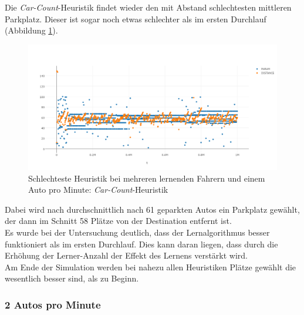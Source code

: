 Die \emph{Car-Count}-Heuristik findet wieder den mit Abstand schlechtesten mittleren Parkplatz. Dieser ist sogar noch etwas schlechter als im ersten Durchlauf (Abbildung \ref{fig:res_pm_1pm_worst}).\\
\begin{figure}
	\includegraphics[width=\textwidth]{analyse/SomeMutants/1pm/car1some.png}
	\caption{Schlechteste Heuristik bei mehreren lernenden Fahrern und einem Auto pro Minute: \emph{Car-Count}-Heuristik}\label{fig:res_pm_1pm_worst}
\end{figure}
Dabei wird nach durchschnittlich nach 61 geparkten Autos ein Parkplatz gewählt, der dann im Schnitt 58 Plätze von der Destination entfernt ist.\\

Es wurde bei der Untersuchung deutlich, dass der Lernalgorithmus besser funktioniert als im ersten Durchlauf. Dies kann daran liegen, dass durch die Erhöhung der Lerner-Anzahl der Effekt des Lernens verstärkt wird.\\
Am Ende der Simulation werden bei nahezu allen Heuristiken Plätze gewählt die wesentlich besser sind, als zu Beginn.

\subsubsection{2 Autos pro Minute}\label{sec:sim_partmutant_2pm}

